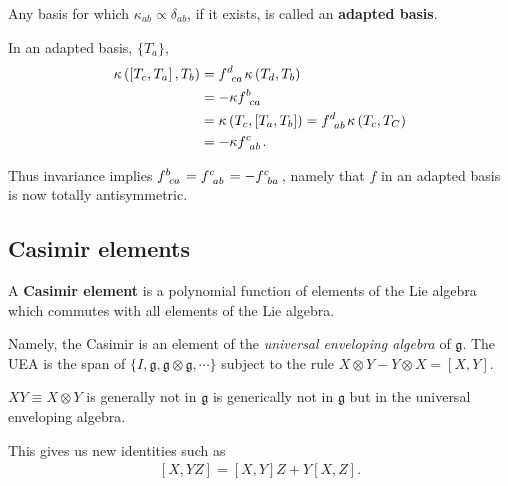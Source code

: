 \begin{definition}
    Any basis for which $\kappa_{ab} \propto \delta_{ab}$, if it exists, is called an \textbf{adapted basis}.
\end{definition}

In an adapted basis, $\{T_a\}$,
\begin{align}
    \kappa \left( \left[ T_c, T_a \right] , T_b \right)  &= \tensor{f}{^{d}_{ca}} \kappa \left( T_d, T_b \right) \\
    &= -\kappa \tensor{f}{^{b}_{ca}}  \\
    &= \kappa \left( T_c, \left[ T_a, T_b \right]  \right) = \tensor{f}{^{d}_{ab}} \kappa \left( T_c , T_C \right)   \\
    &= -\kappa \tensor{f}{^{c}_{ab}} 
.\end{align}

Thus invariance implies $\tensor{f}{^{b}_{ca}} = \tensor{f}{^{c}_{ab}} = -\tensor{f}{^{c}_{ba}}$, namely that $f$ in an adapted basis is now totally antisymmetric.

\subsection{Casimir elements}

\begin{definition}
    A \textbf{Casimir element} is a polynomial function of elements of the Lie algebra which commutes with all elements of the Lie algebra.

    Namely, the Casimir is an element of the \textit{universal enveloping algebra} of $\mathfrak{g}$. The UEA is the span of $\{I, \mathfrak{g}, \mathfrak{g} \otimes \mathfrak{g} , \cdots\} $ subject to the rule $X \otimes Y - Y \otimes X = \left[ X, Y \right] $.
\end{definition}

\begin{note}
    $XY \equiv X \otimes Y$ is generally not in $\mathfrak{g}$ is generically not in $\mathfrak{g}$ but in the universal enveloping algebra. 

    This gives us new identities such as
    \begin{align}
        \left[ X, YZ \right] = \left[ X, Y \right] Z + Y \left[ X, Z \right] 
    .\end{align}
\end{note}

